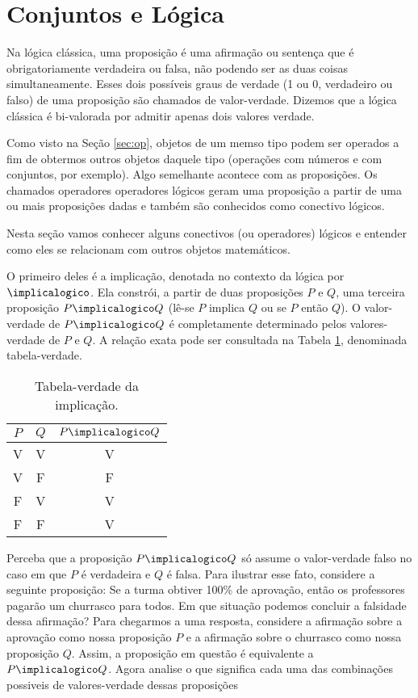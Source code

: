 \section{Conjuntos e Lógica}

Na lógica clássica, uma proposição é uma afirmação ou sentença que é obrigatoriamente verdadeira ou falsa, não podendo ser as duas coisas simultaneamente. Esses dois possíveis graus de verdade (1 ou 0, verdadeiro ou falso) de uma proposição são chamados de valor-verdade. Dizemos que a lógica clássica é bi-valorada por admitir apenas dois valores verdade. 

Como visto na Seção \ref{sec:op}, objetos de um memso tipo podem ser operados a  fim de obtermos outros objetos daquele tipo (operações com números e com conjuntos, por exemplo). Algo semelhante acontece com as proposições. Os chamados operadores operadores lógicos geram uma proposição a partir de uma ou mais proposições dadas e também são conhecidos como conectivo lógicos.
 
Nesta seção vamos conhecer alguns conectivos (ou operadores) lógicos e entender como eles se relacionam com outros objetos matemáticos.

O primeiro deles é a implicação, denotada no contexto da lógica por $\implicalogico$.  Ela constrói, a partir de duas proposições $P$ e $Q$, uma terceira proposição $P \implicalogico Q$ (lê-se $P$ implica $Q$ ou se $P$ então $Q$). O valor-verdade de $P \implicalogico Q$ é completamente determinado pelos valores-verdade de $P$ e $Q$. A relação exata pode ser consultada na Tabela \ref{tbl:implicacao}, denominada tabela-verdade.

\begin{table}[h]
	\centering
	\begin{tabular}{cc|c}
		$P$		& $Q$		& $P \implicalogico Q$ \\ \hline
		V		& V			& V			           \\
		V		& F			& F			           \\
		F		& V			& V			           \\
		F		& F			& V			           \\	
	\end{tabular}
	\caption{Tabela-verdade da implicação.}
	\label{tbl:implicacao}
\end{table}

Perceba que a proposição $P\implicalogico Q$ só assume o valor-verdade falso no caso em que $P$ é verdadeira e $Q$ é falsa. Para ilustrar esse fato, considere a seguinte proposição: Se a turma obtiver 100\% de aprovação, então os professores pagarão um churrasco para todos. Em que situação podemos concluir a falsidade dessa afirmação? 
Para chegarmos a uma resposta, considere a afirmação sobre a aprovação como nossa proposição $P$ e a afirmação sobre o churrasco como nossa proposição $Q$. Assim, a proposição em questão é equivalente a $P\implicalogico Q$. 
Agora analise o que significa cada uma das combinações possiveis de valores-verdade dessas proposições

